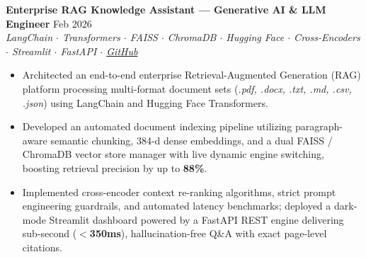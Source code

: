 \textbf{Enterprise RAG Knowledge Assistant --- Generative AI \& LLM Engineer} \hfill Feb 2026\\
\textit{LangChain $\cdot$ Transformers $\cdot$ FAISS $\cdot$ ChromaDB $\cdot$ Hugging Face $\cdot$ Cross-Encoders $\cdot$ Streamlit $\cdot$ FastAPI $\cdot$ \href{https://github.com/ThanujMaligi}{GitHub}}
\begin{itemize}
\item Architected an end-to-end enterprise Retrieval-Augmented Generation (RAG) platform processing multi-format document sets (\textit{.pdf, .docx, .txt, .md, .csv, .json}) using LangChain and Hugging Face Transformers.
\item Developed an automated document indexing pipeline utilizing paragraph-aware semantic chunking, 384-d dense embeddings, and a dual FAISS / ChromaDB vector store manager with live dynamic engine switching, boosting retrieval precision by up to \textbf{88\%}.
\item Implemented cross-encoder context re-ranking algorithms, strict prompt engineering guardrails, and automated latency benchmarks; deployed a dark-mode Streamlit dashboard powered by a FastAPI REST engine delivering sub-second (\textbf{$<$350ms}), hallucination-free Q\&A with exact page-level citations.
\end{itemize}
